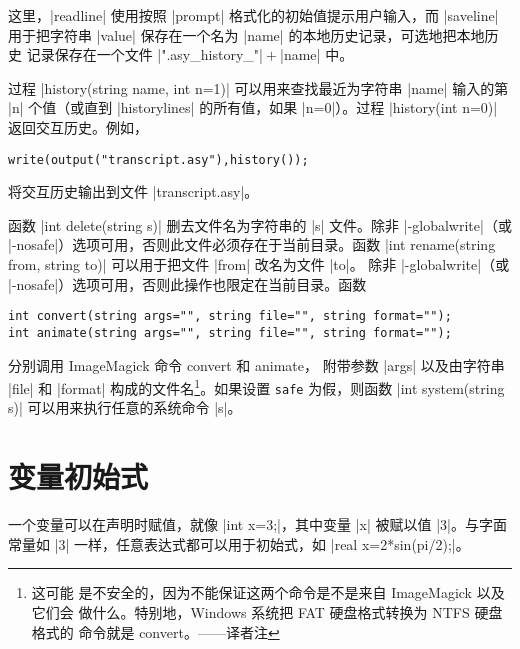 \documentclass[nofonts,CJKnormalspaces]{ctexbook}[2009/05/20]
\newcommand*\prgname[1]{\textsf{#1}}
\newcommand\transnote[1]{\footnote{#1——译者注}}
\begin{document}
这里，|readline| 使用按照 |prompt| 格式化的初始值提示用户输入，而 |saveline|
用于把字符串 |value| 保存在一个名为 |name| 的本地历史记录，可选地把本地历史
记录保存在一个文件 |".asy_history_"|${}+{}$|name| 中。

过程 |history(string name, int n=1)| 可以用来查找最近为字符串 |name| 输入的第
|n| 个值（或直到 |historylines| 的所有值，如果 |n=0|）。过程
|history(int n=0)| 返回交互历史。例如，
\begin{lstlisting}
write(output("transcript.asy"),history());
\end{lstlisting}
将交互历史输出到文件 |transcript.asy|。

函数 |int delete(string s)| 删去文件名为字符串的 |s| 文件。除非
|-globalwrite|（或 |-nosafe|）选项可用，否则此文件必须存在于当前目录。函数
|int rename(string from, string to)| 可以用于把文件 |from| 改名为文件 |to|。
除非 |-globalwrite|（或 |-nosafe|）选项可用，否则此操作也限定在当前目录。函数
\begin{lstlisting}
int convert(string args="", string file="", string format="");
int animate(string args="", string file="", string format="");
\end{lstlisting}
分别调用 \prgname{ImageMagick} 命令 \prgname{convert} 和 \prgname{animate}，
附带参数 |args| 以及由字符串 |file| 和 |format| 构成的文件名\transnote{这可能
是不安全的，因为不能保证这两个命令是不是来自 \prgname{ImageMagick} 以及它们会
做什么。特别地，\prgname{Windows} 系统把 FAT 硬盘格式转换为 NTFS 硬盘格式的
命令就是 \prgname{convert}。}。如果设置 \verb=safe= 为假，则函数
|int system(string s)| 可以用来执行任意的系统命令 |s|。



\section{变量初始式}
\label{sec:initializers}


一个变量可以在声明时赋值，就像 |int x=3;|，其中变量 |x| 被赋以值 |3|。与字面
常量如 |3| 一样，任意表达式都可以用于初始式，如 |real x=2*sin(pi/2);|。
\end{document}
